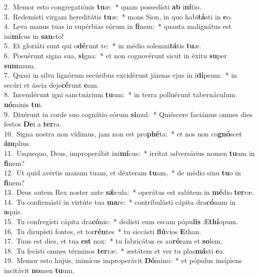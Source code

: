 {2.~}Memor esto congregatiónis \textbf{tu}æ:~* quam possedísti \textbf{ab} i\textbf{ní}tio.\\
{3.~}Redemísti virgam hereditátis \textbf{tu}æ:~* mons Sion, in quo habi\textbf{tá}sti in \textbf{e}o.\\
{4.~}Leva manus tuas in supérbias eórum in \textbf{fi}nem:~* quanta malignátus est ini\textbf{mí}cus in \textbf{san}cto!\\
{5.~}Et gloriáti sunt qui o\textbf{dé}runt te:~* in médio solemni\textbf{tá}tis \textbf{tu}æ.\\
{6.~}Posuérunt signa sua, \textbf{si}gna:~* et non cognovérunt sicut in éxitu \textbf{su}per \textbf{sum}mum.\\
{7.~}Quasi in silva lignórum secúribus excidérunt jánuas ejus in i\textbf{dí}psum:~* in secúri et áscia deje\textbf{cé}runt \textbf{e}am.\\
{8.~}Incendérunt igni sanctuárium \textbf{tu}um:~* in terra polluérunt tabernáculum \textbf{nó}minis \textbf{tu}i.\\
{9.~}Dixérunt in corde suo cognátio eórum \textbf{si}mul:~* Quiéscere faciámus omnes dies festos \textbf{De}i a \textbf{ter}ra.\\
{10.~}Signa nostra non vídimus, jam non est pro\textbf{phé}ta:~* et nos non co\textbf{gnó}scet \textbf{ám}plius.\\
{11.~}Usquequo, Deus, improperábit ini\textbf{mí}cus:~* irrítat adversárius nomen \textbf{tu}um in \textbf{fi}nem?\\
{12.~}Ut quid avértis manum tuam, et déxteram \textbf{tu}am,~* de médio sinu \textbf{tu}o in \textbf{fi}nem?\\
{13.~}Deus autem Rex noster ante \textbf{sǽ}cula:~* operátus est salútem in \textbf{mé}dio \textbf{ter}ræ.\\
{14.~}Tu confirmásti in virtúte tua \textbf{ma}re:~* contribulásti cápita dra\textbf{có}num in \textbf{a}quis.\\
{15.~}Tu confregísti cápita dra\textbf{có}nis:~* dedísti eum escam pópu\textbf{lis} Æ\textbf{thí}opum.\\
{16.~}Tu dirupísti fontes, et tor\textbf{rén}tes~* tu siccásti \textbf{flú}vios \textbf{E}than.\\
{17.~}Tuus est dies, et tua \textbf{est} nox:~* tu fabricátus es au\textbf{ró}ram et \textbf{so}lem.\\
{18.~}Tu fecísti omnes términos \textbf{ter}ræ:~* æstátem et ver tu plas\textbf{má}sti \textbf{e}a.\\
{19.~}Memor esto hujus, inimícus improperávit \textbf{Dó}mino:~* et pópulus insípiens incitávit \textbf{no}men \textbf{tu}um.\\

